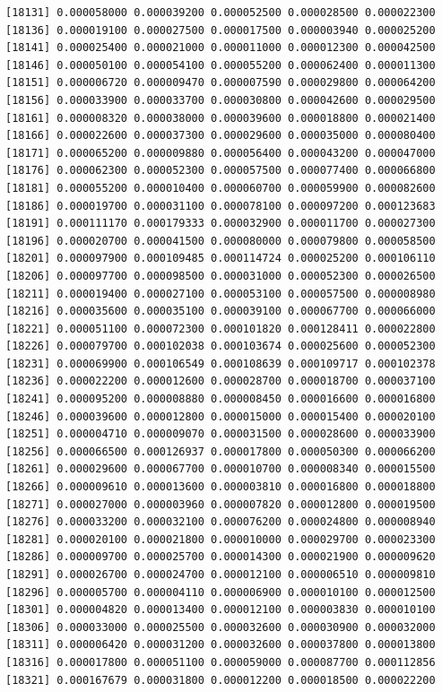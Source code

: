 \documentclass[]{article}
\begin{document}
\begin{verbatim}
[18131] 0.000058000 0.000039200 0.000052500 0.000028500 0.000022300
[18136] 0.000019100 0.000027500 0.000017500 0.000003940 0.000025200
[18141] 0.000025400 0.000021000 0.000011000 0.000012300 0.000042500
[18146] 0.000050100 0.000054100 0.000055200 0.000062400 0.000011300
[18151] 0.000006720 0.000009470 0.000007590 0.000029800 0.000064200
[18156] 0.000033900 0.000033700 0.000030800 0.000042600 0.000029500
[18161] 0.000008320 0.000038000 0.000039600 0.000018800 0.000021400
[18166] 0.000022600 0.000037300 0.000029600 0.000035000 0.000080400
[18171] 0.000065200 0.000009880 0.000056400 0.000043200 0.000047000
[18176] 0.000062300 0.000052300 0.000057500 0.000077400 0.000066800
[18181] 0.000055200 0.000010400 0.000060700 0.000059900 0.000082600
[18186] 0.000019700 0.000031100 0.000078100 0.000097200 0.000123683
[18191] 0.000111170 0.000179333 0.000032900 0.000011700 0.000027300
[18196] 0.000020700 0.000041500 0.000080000 0.000079800 0.000058500
[18201] 0.000097900 0.000109485 0.000114724 0.000025200 0.000106110
[18206] 0.000097700 0.000098500 0.000031000 0.000052300 0.000026500
[18211] 0.000019400 0.000027100 0.000053100 0.000057500 0.000008980
[18216] 0.000035600 0.000035100 0.000039100 0.000067700 0.000066000
[18221] 0.000051100 0.000072300 0.000101820 0.000128411 0.000022800
[18226] 0.000079700 0.000102038 0.000103674 0.000025600 0.000052300
[18231] 0.000069900 0.000106549 0.000108639 0.000109717 0.000102378
[18236] 0.000022200 0.000012600 0.000028700 0.000018700 0.000037100
[18241] 0.000095200 0.000008880 0.000008450 0.000016600 0.000016800
[18246] 0.000039600 0.000012800 0.000015000 0.000015400 0.000020100
[18251] 0.000004710 0.000009070 0.000031500 0.000028600 0.000033900
[18256] 0.000066500 0.000126937 0.000017800 0.000050300 0.000066200
[18261] 0.000029600 0.000067700 0.000010700 0.000008340 0.000015500
[18266] 0.000009610 0.000013600 0.000003810 0.000016800 0.000018800
[18271] 0.000027000 0.000003960 0.000007820 0.000012800 0.000019500
[18276] 0.000033200 0.000032100 0.000076200 0.000024800 0.000008940
[18281] 0.000020100 0.000021800 0.000010000 0.000029700 0.000023300
[18286] 0.000009700 0.000025700 0.000014300 0.000021900 0.000009620
[18291] 0.000026700 0.000024700 0.000012100 0.000006510 0.000009810
[18296] 0.000005700 0.000004110 0.000006900 0.000010100 0.000012500
[18301] 0.000004820 0.000013400 0.000012100 0.000003830 0.000010100
[18306] 0.000033000 0.000025500 0.000032600 0.000030900 0.000032000
[18311] 0.000006420 0.000031200 0.000032600 0.000037800 0.000013800
[18316] 0.000017800 0.000051100 0.000059000 0.000087700 0.000112856
[18321] 0.000167679 0.000031800 0.000012200 0.000018500 0.000022200

\end{verbatim}
\end{document}
